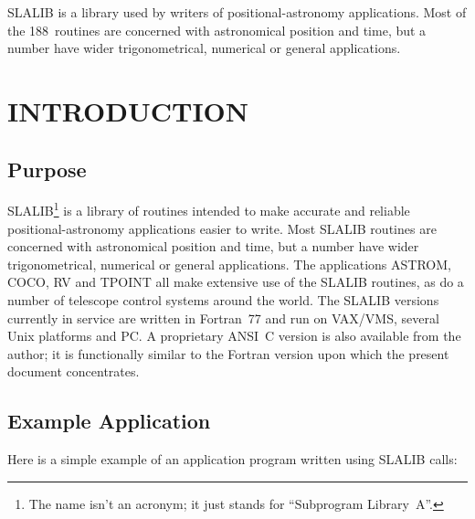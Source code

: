 \documentclass[11pt,twoside]{article}
\newcommand{\stardocinitials}  {SUN}
\newcommand{\stardocnumber}    {67.70}
\newcommand{\stardocname}{\stardocinitials /\stardocnumber}
\newenvironment{latexonly}{}{}
\newcommand{\latexonlytoc}[0]{\tableofcontents}
\newcommand{\nroutines} {188}
\renewcommand{\thepage}{\roman{page}}
\begin{document}
SLALIB is a library used by writers of positional-astronomy applications.
Most of the \nroutines\ routines are concerned with astronomical position
and time,
but a number have wider trigonometrical, numerical or general applications.
 \newpage
 \begin{latexonly}
   \setlength{\parskip}{0mm}
   \latexonlytoc
   \setlength{\parskip}{\medskipamount}
   \markright{\stardocname}
 \end{latexonly}
\newpage
\renewcommand{\thepage}{\arabic{page}}
\setcounter{page}{1}

\section{INTRODUCTION}
\subsection{Purpose}
SLALIB\footnote{The name isn't an acronym;
it just stands for ``Subprogram Library~A''.}
is a library of routines
intended to make accurate and reliable positional-astronomy
applications easier to write.
Most SLALIB routines are concerned with astronomical position and time, but a
number have wider trigonometrical, numerical or general applications.
The applications ASTROM, COCO, RV and TPOINT
all make extensive use of the SLALIB
routines, as do a number of telescope control systems around the world.
The SLALIB versions currently in service are written in
Fortran~77 and run on VAX/VMS, several Unix platforms and PC.
A proprietary ANSI~C version is also available from the author;  it is
functionally similar to the Fortran version upon which the present
document concentrates.

\subsection{Example Application}
Here is a simple example of an application program written
using SLALIB calls:
\end{document}

